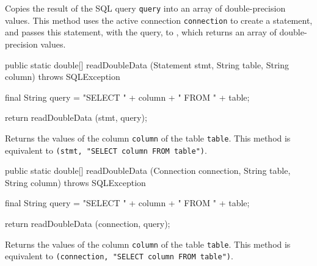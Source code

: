 \begin{tabb}
   Copies the result of the SQL query \texttt{query} into an array of double-precision values.
   This method uses the active connection \texttt{connection} to create
   a statement, and passes this statement, with the query, to
   , which returns an
   array of double-precision values.
\end{tabb}
\begin{htmlonly}
\end{htmlonly}
\begin{code}

   public static double[] readDoubleData (Statement stmt, String table,
                                          String column)
            throws SQLException\begin{hide} {
        final String query = "SELECT " + column + " FROM " + table;
        
        return readDoubleData (stmt, query);
    }\end{hide}
\end{code}
\begin{tabb}
   Returns the values of the column \texttt{column} of the table \texttt{table}.
   This method is equivalent to 
   \texttt{(stmt, "SELECT column FROM table")}.
\end{tabb}
\begin{code}

   public static double[] readDoubleData (Connection connection,
                                          String table, String column)
            throws SQLException\begin{hide} {
        final String query = "SELECT " + column + " FROM " + table;
        
        return readDoubleData (connection, query);
    }\end{hide}
\end{code}
\begin{tabb}
   Returns the values of the column \texttt{column} of the table \texttt{table}.
   This method is equivalent to 
   \texttt{(connection, "SELECT column FROM table")}.
\end{tabb}
